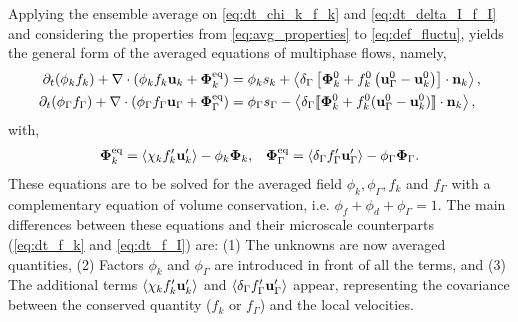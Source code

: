 Applying the ensemble average on \ref{eq:dt_chi_k_f_k} and \ref{eq:dt_delta_I_f_I} and considering the properties from \ref{eq:avg_properties} to \ref{eq:def_fluctu}, yields the general form of the averaged equations of multiphase flows, namely,
\begin{align}
    \partial_t (\phi_k f_k)
    +\mathbf{\nabla}\cdot (\phi_k f_k \textbf{u}_k + \mathbf{\Phi}_k^\text{eq})
    &= 
    \phi_k s_k
    + \left<\delta_\Gamma\left[
        \mathbf{\Phi}_k^0
        + f_k^0
        \left(
            \textbf{u}_\Gamma^0
            - \textbf{u}_k^0
        \right)
    \right]
    \cdot \textbf{n}_k\right>,
    \label{eq:avg_dt_chi_f}\\
    \partial_t (\phi_\Gamma f_\Gamma)
    +\mathbf{\nabla}\cdot (\phi_\Gamma f_\Gamma \textbf{u}_\Gamma+ \mathbf{\Phi}_\Gamma^\text{eq})
    &= 
    \phi_\Gamma s_\Gamma
    - \left<\delta_\Gamma 
    \llbracket 
    \mathbf{\Phi}_k^0
    + f_k^0 (\textbf{u}_\Gamma^0 - \textbf{u}_k^0)
     \rrbracket \cdot \textbf{n}_k 
     \right>,
    \label{eq:avg_dt_delta_f}
\end{align}
with, 
\begin{align}
    \mathbf{\Phi}_k^\text{eq}
    = \left<\chi_k f_k' \textbf{u}_k'\right>
    - \phi_k \bm\Phi_k,
    &&
    \mathbf{\Phi}_\Gamma^\text{eq}
    = \left<\delta_\Gamma f_\Gamma' \textbf{u}_\Gamma'\right>
    - \phi_\Gamma \bm\Phi_\Gamma. 
\end{align}
These equations are to be solved for the averaged field $\phi_k,\phi_\Gamma,f_k$ and $f_\Gamma$ with a complementary equation of volume conservation, i.e. $\phi_f+\phi_d+\phi_\Gamma = 1$.
The main differences between these equations and their microscale counterparts (\ref{eq:dt_f_k} and \ref{eq:dt_f_I}) are:
(1) The unknowns are now averaged quantities,
(2) Factors $\phi_k$ and $\phi_\Gamma$ are introduced in front of all the terms, and
(3) The additional terms $\left<\chi_k f_k' \textbf{u}_k'\right>$ and $\left<\delta_\Gamma f_\Gamma' \textbf{u}_\Gamma'\right>$ appear, representing the covariance between the conserved quantity ($f_k$ or $f_\Gamma$) and the local velocities.  


